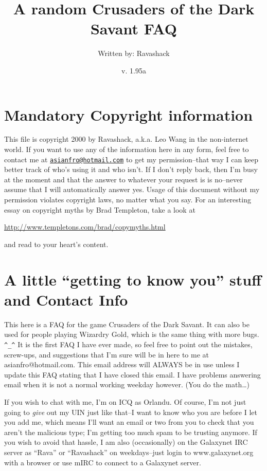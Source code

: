 \documentclass[12pt]{article}
\title{A random Crusaders of the Dark Savant FAQ}
\author{Written by: Ravashack}
\date{v. 1.95a}
\begin{document}
\maketitle

\section{Mandatory Copyright
information}\label{mandatory-copyright-information}

This file is copyright 2000 by Ravashack, a.k.a. Leo Wang in the non-internet
world. If you want to use any of the information here in any form, feel free
to contact me at
\href{mailto:asianfro@hotmail.com}{\nolinkurl{asianfro@hotmail.com}} to get
my permission--that way I can keep better track of who's using it and who
isn't. If I don't reply back, then I'm busy at the moment and that the answer
to whatever your request is is no--never assume that I will automatically
answer yes. Usage of this document without my permission violates copyright
laws, no matter what you say. For an interesting essay on copyright myths by
Brad Templeton, take a look at

\url{http://www.templetons.com/brad/copymyths.html}

and read to your heart's content.

\section{\texorpdfstring{A little ``getting to know you'' stuff and
Contact
Info}{A little getting to know you stuff and Contact Info}}\label{a-little-getting-to-know-you-stuff-and-contact-info}

This here is a FAQ for the game Crusaders of the Dark Savant. It can also be
used for people playing Wizardry Gold, which is the same thing with more
bugs. \texttt{\^{}\_\^{}} It is the first FAQ I have ever made, so feel free
to point out the mistakes, screw-ups, and suggestions that I'm sure will be
in here to me at asianfro@hotmail.com. This email address will ALWAYS be in
use unless I update this FAQ stating that I have closed this email. I have
problems answering email when it is not a normal working weekday
however. (You do the math\ldots{})

If you wish to chat with me, I'm on ICQ as Orlandu. Of course, I'm not
just going to \emph{give} out my UIN just like that--I want to know who
you are before I let you add me, which means I'll want an email or two
from you to check that you aren't the malicious type; I'm getting too
much spam to be trusting anymore. If you wish to avoid that hassle, I am
also (occasionally) on the Galaxynet IRC server as ``Rava'' or
``Ravashack'' on weekdays--just login to www.galaxynet.org with a
browser or use mIRC to connect to a Galaxynet server.
\end{document}
